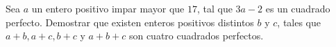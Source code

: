 Sea $a$ un entero positivo impar mayor que $17$, tal que $3a-2$ es un cuadrado perfecto. Demostrar que existen enteros positivos distintos $b$ y $c$, tales que $a+b,a+c,b+c$ y $a+b+c$ son cuatro cuadrados perfectos.
